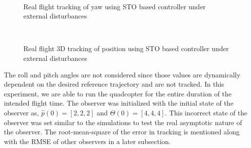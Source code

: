 \documentclass[letterpaper%
, twoside%
, 12pt%
,memoire%
, english%
,creativecommons,hyperref%
]{thETS}
\begin{document}
\begin{figure}[H]
	\centering
	 \\ \parbox{0.75\textwidth}{\caption{Real flight tracking of yaw using STO based controller under external disturbances\label{Fig:yawtracSTODist}}}
\end{figure}
\begin{figure}[H]
	\centering
	 \\ \parbox{0.75\textwidth}{\caption{Real flight 3D tracking of position using STO based controller under external disturbances\label{Fig:3dSTODist}}}
\end{figure}
The roll and pitch angles are not considered since those values are dynamically dependent on the desired reference trajectory and are not tracked. In this experiment, we are able to run the quadcopter for the entire duration of the intended flight time. The observer was initialized with the initial state of the observer as, $\hat{p}(0)=[2,2,2]$ and $\hat{\Theta}(0)=[4,4,4]$. This incorrect state of the observer was set similar to the simulations to test the real asymptotic nature of the observer. The root-mean-square of the error in tracking is mentioned along with the RMSE of other observers in a later subsection.
\end{document}
